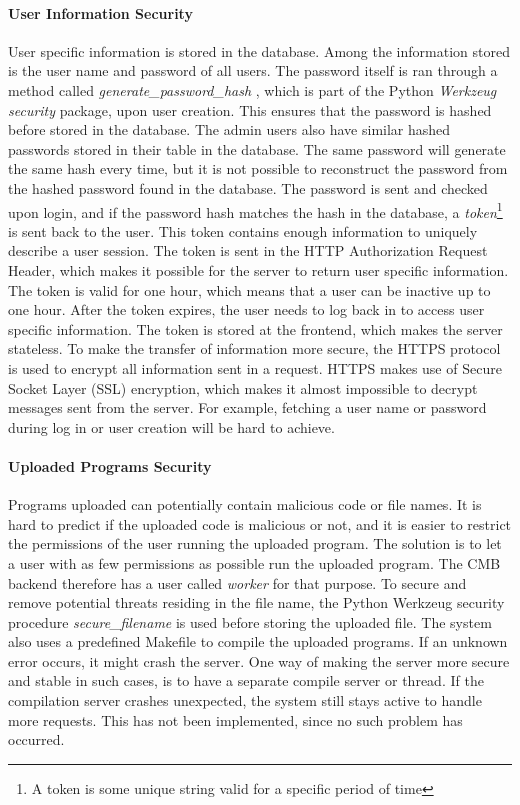 \paragraph*{User Information Security}
User specific information is stored in the database. Among the information stored is the user name and password of all users. The password itself is ran through a method called \textit{generate\_password\_hash} \cite{m:gph}, which is part of the Python \textit{Werkzeug security} package, upon user creation. This ensures that the password is hashed before stored in the database. The admin users also have similar hashed passwords stored in their table in the database. The same password will generate the same hash every time, but it is not possible to reconstruct the password from the hashed password found in the database. The password is sent and checked upon login, and if the password hash matches the hash in the database, a \textit{token}\footnote{A token is some unique string valid for a specific period of time} is sent back to the user. This token contains enough information to uniquely describe a user session. The token is sent in the HTTP Authorization Request Header, which makes it possible for the server to return user specific information. The token is valid for one hour, which means that a user can be inactive up to one hour. After the token expires, the user needs to log back in to access user specific information. The token is stored at the frontend, which makes the server stateless. To make the transfer of information more secure, the HTTPS protocol is used to encrypt all information sent in a request. HTTPS makes use of Secure Socket Layer (SSL) encryption, which makes it almost impossible to decrypt messages sent from the server. For example, fetching a user name or password during log in or user creation will be hard to achieve.

\paragraph*{Uploaded Programs Security}
Programs uploaded can potentially contain malicious code or file names. It is hard to predict if the uploaded code is malicious or not, and it is easier to restrict the permissions of the user running the uploaded program. The solution is to let a user with as few permissions as possible run the uploaded program. The CMB backend therefore has a user called \textit{worker} for that purpose. To secure and remove potential threats residing in the file name, the Python Werkzeug security procedure \textit{secure\_filename} \cite{m:sf} is used before storing the uploaded file. The system also uses a predefined Makefile to compile the uploaded programs. If an unknown error occurs, it might crash the server. One way of making the server more secure and stable in such cases, is to have a separate compile server or thread. If the compilation server crashes unexpected, the system still stays active to handle more requests. This has not been implemented, since no such problem has occurred.

